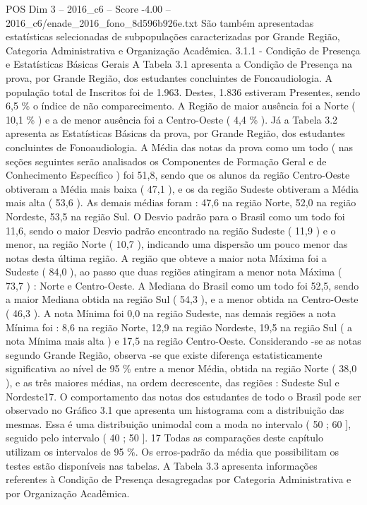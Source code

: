\begin{textsample}{POS Dim 3 – 2016\_c6 – Score -4.00 – 2016\_c6/enade\_2016\_fono\_8d596b926e.txt}
São também apresentadas estatísticas selecionadas de subpopulações caracterizadas por Grande Região, Categoria Administrativa e Organização Acadêmica. 3.1.1 - Condição de Presença e Estatísticas Básicas Gerais A Tabela 3.1 apresenta a Condição de Presença na prova, por Grande Região, dos estudantes concluintes de Fonoaudiologia.
A população total de Inscritos foi de 1.963.
Destes, 1.836 estiveram Presentes, sendo 6,5 \% o índice de não comparecimento.
A Região de maior ausência foi a Norte ( 10,1 \% ) e a de menor ausência foi a Centro-Oeste ( 4,4 \% ).
Já a Tabela 3.2 apresenta as Estatísticas Básicas da prova, por Grande Região, dos estudantes concluintes de Fonoaudiologia.
A Média das notas da prova como um todo ( nas seções seguintes serão analisados os Componentes de Formação Geral e de Conhecimento Específico ) foi 51,8, sendo que os alunos da região Centro-Oeste obtiveram a Média mais baixa ( 47,1 ), e os da região Sudeste obtiveram a Média mais alta ( 53,6 ).
As demais médias foram : 47,6 na região Norte, 52,0 na região Nordeste, 53,5 na região Sul.
O Desvio padrão para o Brasil como um todo foi 11,6, sendo o maior Desvio padrão encontrado na região Sudeste ( 11,9 ) e o menor, na região Norte ( 10,7 ), indicando uma dispersão um pouco menor das notas desta última região.
A região que obteve a maior nota Máxima foi a Sudeste ( 84,0 ), ao passo que duas regiões atingiram a menor nota Máxima ( 73,7 ) : Norte e Centro-Oeste.
A Mediana do Brasil como um todo foi 52,5, sendo a maior Mediana obtida na região Sul ( 54,3 ), e a menor obtida na Centro-Oeste ( 46,3 ).
A nota Mínima foi 0,0 na região Sudeste, nas demais regiões a nota Mínima foi : 8,6 na região Norte, 12,9 na região Nordeste, 19,5 na região Sul ( a nota Mínima mais alta ) e 17,5 na região Centro-Oeste.
Considerando -se as notas segundo Grande Região, observa -se que existe diferença estatisticamente significativa ao nível de 95 \% entre a menor Média, obtida na região Norte ( 38,0 ), e as três maiores médias, na ordem decrescente, das regiões : Sudeste Sul e Nordeste17.
O comportamento das notas dos estudantes de todo o Brasil pode ser observado no Gráfico 3.1 que apresenta um histograma com a distribuição das mesmas.
Essa é uma distribuição unimodal com a moda no intervalo ( 50 ; 60 ], seguido pelo intervalo ( 40 ; 50 ]. 17 Todas as comparações deste capítulo utilizam os intervalos de 95 \%.
Os erros-padrão da média que possibilitam os testes estão disponíveis nas tabelas.
A Tabela 3.3 apresenta informações referentes à Condição de Presença desagregadas por Categoria Administrativa e por Organização Acadêmica.

\end{textsample}

